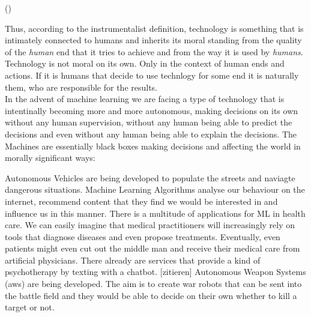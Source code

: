 \documentclass{article}
\begin{document}
(\cite[p.4]{heidegger1977technology})

Thus, according to the instrumentalist definition, technology is something that
is intimately connected to humans and inherits its moral standing from the
quality of the \textit{human} end that it tries to achieve and from the way
it is used by \textit{humans}. Technology is not moral on its own. Only in the
context of human ends and actions. If it is humans that decide to use technlogy
for some end it is naturally them, who are responsible for the results.\\

In the advent of machine learning we are facing a type of technology that is
intentinally becoming more and more autonomous, making decisions on its own
without any human supervision, without any human being able to predict the
decisions and even without any human being able to explain the decisions. The
Machines are essentially black boxes making decisions and affecting the world in
morally significant ways:

Autonomous Vehicles are being developed to populate the streets and naviagte
dangerous situations.
Machine Learning Algorithms analyse our behaviour on the internet, recommend
content that they find we would be interested in and influence us in this
manner.
There is a multitude of applications for ML in health care. We can easily
imagine that medical practitioners will increasingly rely on tools that diagnose
diseases and even propose treatments. Eventually, even patients might even cut
out the middle man and receive their medical care from artificial physicians.
There already are services that provide a kind of psychotherapy by texting with
a chatbot. [zitieren]
Autonomous Weapon Systems (\acrshort{aws}) are being developed. The aim is to
create war robots that can be sent into the battle field and they would be able
to decide on their own whether to kill a target or not.




%
\end{document}
